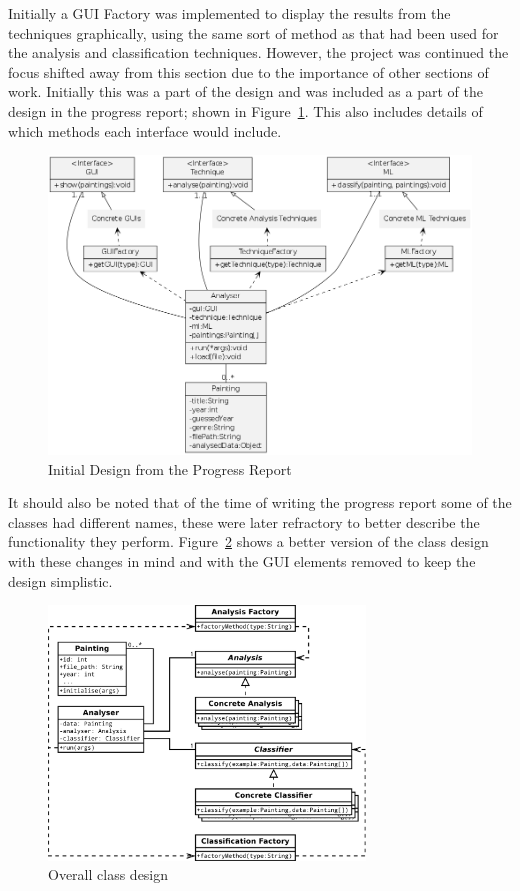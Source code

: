 Initially a GUI Factory was implemented to display the results from the techniques graphically, 
using the same sort of method as that had been used for the analysis and classification 
techniques. However, the project was continued the focus shifted away from this section due to
the importance of other sections of work. Initially this was a part of the design and was included 
as a part of the design in the progress report; shown in Figure~\ref{fig:prog-design}. This also 
includes details of which methods each interface would include.


\begin{figure}[h!]
\centering
\includegraphics[width=\textwidth]{../ProgressReport/img/design.png}
\caption{Initial Design from the Progress Report}\label{fig:prog-design}
\end{figure}

It should also be noted that of the time of writing the progress report some of the classes had
different names, these were later refractory to better describe the functionality they perform.
Figure~\ref{fig:uml} shows a better version of the class design with these changes in mind and
with the GUI elements removed to keep the design simplistic.

\begin{figure}[h]
\centering
\includegraphics[width=0.75\textwidth]{img/uml}
\caption{Overall class design}\label{fig:uml}
\end{figure}

